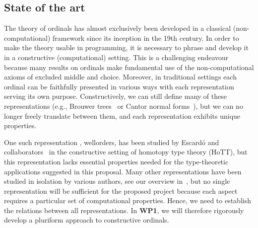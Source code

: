 \documentclass[a4paper,11pt]{article}
\let\oldcite\cite
\renewcommand*\cite[1]{{\protect\NoHyper\oldcite{#1}\protect\endNoHyper}}
\begin{document}
\subsection{State of the art}\label{state-of-the-art}
The theory of ordinals has almost exclusively been developed in a classical (non-computational) framework since its inception in the 19th century.
%
In order to make the theory usable in programming, it is necessary to phrase and develop it in a constructive (computational) setting.
This is a challenging endeavour because many results on ordinals make fundamental use of the non-computational axioms of excluded middle and choice.
Moreover, in traditional settings each ordinal can be faithfully presented in various ways with each representation serving its own purpose.
%
Constructively, we can still define many of these representations (e.g., Brouwer trees~\cite{lombardi_ordinals} or Cantor normal forms~\cite{NordvallForsbergXu2020ord}), but we can no longer freely translate between them, and each representation exhibits unique properties.

One such representation%
, wellorders,
has been studied by Escard\'o and collaborators~\cite{TypeTopologyOrdinals} in the constructive setting of homotopy type theory (HoTT), but this representation lacks essential properties needed for the type-theoretic applications suggested in this proposal.
%
Many other representations have been studied in isolation by various authors, see our overview in~\cite{ordTCS}, but no single representation will be sufficient for the proposed project because each aspect requires a particular set of computational properties. Hence, we need to establish the relations between all representations.
%
In \textbf{WP1}, we will therefore rigorously develop a pluriform approach to constructive ordinals.
\end{document}
